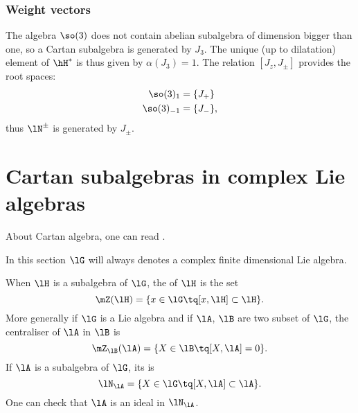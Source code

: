 \subsubsection{Weight vectors}  \label{subSubSecweightsotrois}

The algebra $\so(3)$ does not contain abelian subalgebra of dimension bigger than one, so a Cartan subalgebra is generated by $J_3$. The unique (up to dilatation) element of $\hH^*$ is thus given by $\alpha(J_3)=1$. The relation $[J_z,J_{\pm}]$ provides the root spaces:
\begin{equation}
    \begin{aligned}
        \so(3)_1    &=\{ J_+ \}\\
        \so(3)_{-1} &=\{ J_- \},
    \end{aligned}
\end{equation}
thus $\lN^{\pm}$ is generated by $J_{\pm}$.


\section{Cartan subalgebras in complex Lie algebras}
\label{SecCartaninComplex}
About Cartan algebra, one can read \cite{Dragan,Berndt,Hochschild,SamelsonNotesLieAlg}.

In this section $\lG$ will always denotes a complex finite dimensional Lie algebra.

\begin{definition}\label{PgDefCentralisateur}
    When \( \lH\) is a subalgebra of \( \lG\), the  of \( \lH\) is the set
    \begin{equation}
        \mZ(\lH)=\{x\in\lG\tq [x,\lH]\subset\lH\}.
    \end{equation}
    More generally if $\lG$ is a Lie algebra and if $\lA$, $\lB$ are two subset of $\lG$, the centraliser of $\lA$ in $\lB$ is
    \begin{equation}
        \mZ_{\lB}(\lA)=\{X\in\lB\tq [X,\lA]=0\}.
    \end{equation}
    If $\lA$ is a subalgebra of $\lG$, its  is
    \begin{equation}
        \lN_{\lA}=\{X\in\lG\tq [X,\lA]\subset\lA\}.
    \end{equation}
    One can check that $\lA$ is an ideal in $\lN_{\lA}$.
\end{definition}

